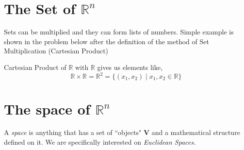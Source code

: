 \documentclass[letter]{article}
\begin{document}
	\section*{The Set of $\mathbb{R}^{n}$ } 
	\textsf{Sets can be multiplied and they can form lists of numbers. Simple example is shown in the problem below after the definition of the method of Set Multiplication (Cartesian Product)} 



	Cartesian Product of $\mathbb{R}$ with $\mathbb{R}$ gives us elements like,
	\[
	\mathbb{R} \times  \mathbb{R} = 
	\mathbb{R}^{2} = \{(x_1, x_2)  \mid x_1, x_2 \in \mathbb{R}\} 
	\]

	\df{
	\[
	\mathbb{R}^{n} = \mathbb{R} \times  \cdots \times \mathbb{R} = 
	\{(x_1, \ldots, x_n)  \mid x_1 , \ldots, x_n \in \mathbb{R}\} 
	\] 
	}





\section*{The space of $\mathbb{R}^{n}$ }
A \emph{space} is anything that has a set of ``objects" $\mathbf V$ and a mathematical structure defined on it.  We are specifically interested on \emph{Euclidean Spaces.} 
\end{document}
